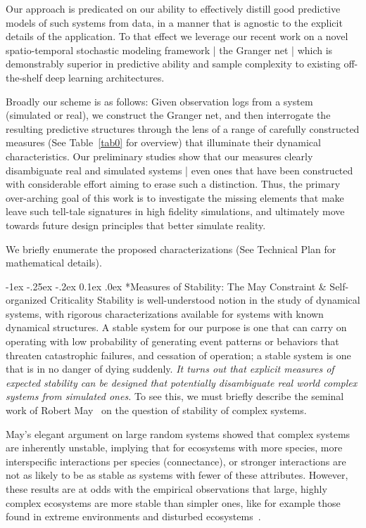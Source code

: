 \documentclass[onecolumn, compsoc,11pt]{IEEEtran}
\makeatletter
\renewcommand\subsection{\@startsection {section}{1}{\z@}%
  {-1ex \@plus -.25ex \@minus -.2ex}%
  {0.1ex \@plus.0ex}%
  {\fontsize{11}{10}\selectfont\bfseries\sffamily\color{DodgerBlue4}}}
\makeatother
\begin{document}
Our approach is predicated on our ability to effectively distill good predictive models of  such systems from data, in a manner that is agnostic to the explicit details of the application. To that effect we leverage our recent work on a novel  spatio-temporal stochastic modeling framework   | the Granger net | which is  demonstrably superior in predictive ability and sample complexity to   existing off-the-shelf deep learning architectures.

Broadly our scheme is as follows: Given observation logs from a system (simulated or real), we construct the Granger net, and then interrogate the resulting predictive structures through the lens of a range of carefully constructed measures (See Table~\ref{tab0} for overview) that illuminate their dynamical characteristics. Our preliminary studies show that our measures  clearly disambiguate real and simulated systems | even ones that have been constructed  with considerable  effort aiming  to erase such a distinction.
%
Thus, the primary over-arching goal of this work is to investigate the missing elements that make leave such tell-tale signatures in high fidelity simulations, and ultimately move towards future design principles that better simulate reality.

We briefly enumerate the proposed characterizations (See Technical Plan for mathematical details).

\subsection*{Measures of Stability: The May Constraint \& Self-organized Criticality}
Stability is well-understood notion in the study of dynamical systems, with
rigorous characterizations available for systems with known dynamical structures.
A stable system for our purpose is one that can carry on operating with low probability of generating event patterns or behaviors that threaten catastrophic failures, and cessation of operation; a stable system is one that is in no danger of dying suddenly. \textit{It turns out that explicit  measures of expected stability can be designed that potentially disambiguate real world complex systems from simulated ones.} To see this, we must briefly describe the seminal work of Robert May~\cite{may1972will,may2001stability} on the question of stability of complex systems.

May's elegant argument on large random systems  showed  that  complex systems are inherently unstable, implying that for  ecosystems with more species, more interspecific interactions per species (connectance), or stronger interactions are not as likely to  be as stable as systems with fewer of these attributes. However, these results are at odds with the empirical  observations  that large, highly complex ecosystems are  more stable than simpler ones, like for example those found in extreme environments and disturbed ecosystems~\cite{jacquet2016no}.
\end{document}
